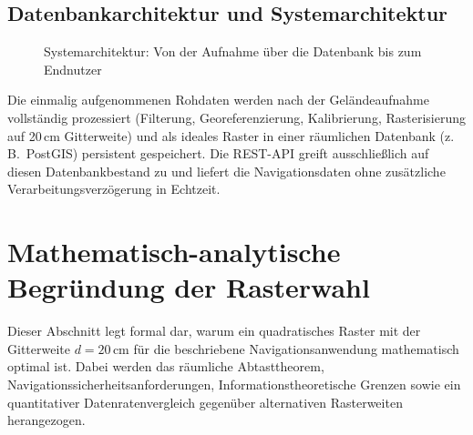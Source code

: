 ﻿\documentclass[a4paper,12pt]{article}
\theoremstyle{definition}
\begin{document}
\subsection{Datenbankarchitektur und Systemarchitektur}

\begin{figure}[h]
\centering
{}
\caption{Systemarchitektur: Von der Aufnahme \"{u}ber die Datenbank bis zum Endnutzer}
\label{fig:architektur}
\end{figure}

\noindent
Die einmalig aufgenommenen Rohdaten werden nach der Gel\"{a}ndeaufnahme vollst\"{a}ndig
prozessiert (Filterung, Georeferenzierung, Kalibrierung, Rasterisierung auf 20\,cm
Gitterweite) und als ideales Raster in einer r\"{a}umlichen Datenbank (z.\,B.\ PostGIS)
persistent gespeichert. Die REST-API greift ausschlie\ss{}lich auf diesen Datenbankbestand
zu und liefert die Navigationsdaten ohne zus\"{a}tzliche Verarbeitungsverz\"{o}gerung in Echtzeit.

\section{Mathematisch-analytische Begründung der Rasterwahl}

Dieser Abschnitt legt formal dar, warum ein quadratisches Raster mit der Gitterweite
$d = 20\,\text{cm}$ für die beschriebene Navigationsanwendung mathematisch optimal ist.
Dabei werden das räumliche Abtasttheorem, Navigationssicherheitsanforderungen,
Informationstheoretische Grenzen sowie ein quantitativer Datenratenvergleich gegenüber
alternativen Rasterweiten herangezogen.
\end{document}
